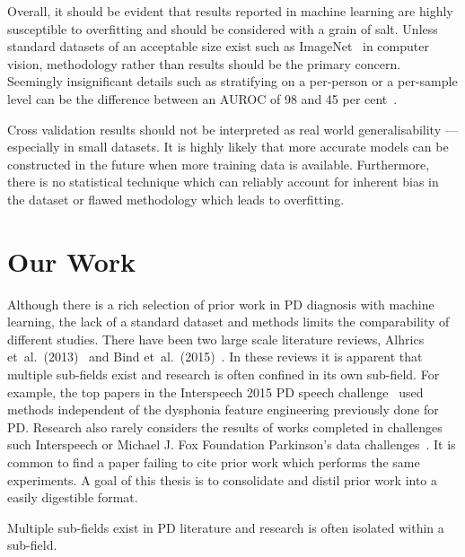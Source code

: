 \documentclass[12pt, twoside]{book}
\begin{document}
Overall, it should be evident that results reported in machine learning are highly susceptible to overfitting and should be considered with a grain of salt. Unless standard datasets of an acceptable size exist such as ImageNet~\cite{imagenet} in computer vision, methodology rather than results should be the primary concern. Seemingly insignificant details such as stratifying on a per-person or a per-sample level can be the difference between an AUROC of 98 and 45 per cent~\cite{mpowerneto2017analysis}. 

Cross validation results should not be interpreted as real world generalisability --- especially in small datasets. It is highly likely that more accurate models can be constructed in the future when more training data is available. Furthermore, there is no statistical technique which can reliably account for inherent bias in the dataset or flawed methodology which leads to overfitting.





\chapter{Our Work}
\label{ourwork}
Although there is a rich selection of prior work in PD diagnosis with machine learning, the lack of a standard dataset and methods limits the comparability of different studies. There have been two large scale literature reviews, Alhrics et~al.~(2013)~\cite{review2013} and Bind et~al.~(2015)~\cite{review2015}. In these reviews it is apparent that multiple sub-fields exist and research is often confined in its own sub-field. For example, the top papers in the Interspeech 2015 PD speech challenge~\cite{compareis15pd} used methods independent of the dysphonia feature engineering previously done for PD. Research also rarely considers the results of works completed in challenges such Interspeech or Michael J. Fox Foundation Parkinson's data challenges~\cite{mjfoxchallenge2013}. It is common to find a paper failing to cite prior work which performs the same experiments. A goal of this thesis is to consolidate and distil prior work into a easily digestible format. 

\begin{highlight}
Multiple sub-fields exist in PD literature and research is often isolated within a sub-field.
\end{highlight}
\end{document}
